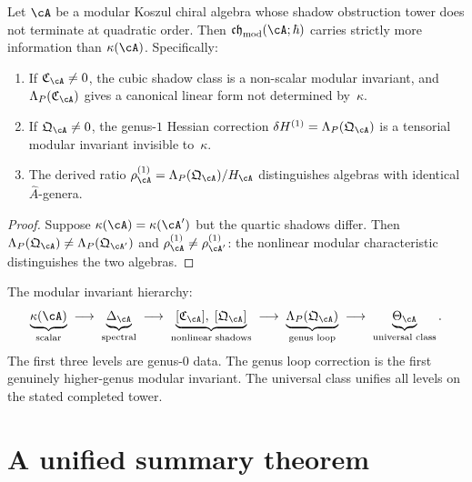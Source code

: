 \begin{theorem}
\label{thm:nms-beyond-ahat}
Let $\cA$ be a modular Koszul chiral algebra whose shadow obstruction tower does not terminate at quadratic order. Then $\mathfrak{ch}_{\mathrm{mod}}(\cA;\hbar)$ carries strictly more information than $\kappa(\cA)$. Specifically:
\begin{enumerate}[label=\textup{(\roman*)}]
\item If $\mathfrak C_{\cA}\neq 0$, the cubic shadow class is a non-scalar modular invariant, and $\Lambda_P(\mathfrak C_{\cA})$ gives a canonical linear form not determined by~$\kappa$.
\item If $\mathfrak Q_{\cA}\neq 0$, the genus-$1$ Hessian correction $\delta H^{(1)}=\Lambda_P(\mathfrak Q_{\cA})$ is a tensorial modular invariant invisible to~$\kappa$.
\item The derived ratio $\rho^{(1)}_{\cA}=\Lambda_P(\mathfrak Q_{\cA})/H_{\cA}$ distinguishes algebras with identical $\hat{A}$-genera.
\end{enumerate}
\end{theorem}

\begin{proof}
Suppose $\kappa(\cA)=\kappa(\cA')$ but the quartic shadows differ. Then $\Lambda_P(\mathfrak Q_{\cA})\neq \Lambda_P(\mathfrak Q_{\cA'})$ and $\rho^{(1)}_{\cA}\neq \rho^{(1)}_{\cA'}$: the nonlinear modular characteristic distinguishes the two algebras.\qedhere
\end{proof}

\begin{remark}
\label{rem:nms-invariant-hierarchy-summary}
The modular invariant hierarchy:
\[
\underbrace{\kappa(\cA)}_{\text{scalar}}
\;\longrightarrow\;
\underbrace{\Delta_{\cA}}_{\text{spectral}}
\;\longrightarrow\;
\underbrace{[\mathfrak C_{\cA}],\;[\mathfrak Q_{\cA}]}_{\text{nonlinear shadows}}
\;\longrightarrow\;
\underbrace{\Lambda_P(\mathfrak Q_{\cA})}_{\text{genus loop}}
\;\longrightarrow\;
\underbrace{\Theta_{\cA}}_{\text{universal class}}.
\]
The first three levels are genus-$0$ data. The genus loop correction is the first genuinely higher-genus modular invariant. The universal class unifies all levels on the stated completed tower.
\end{remark}

\section{A unified summary theorem}
\label{sec:nms-summary-theorem}

